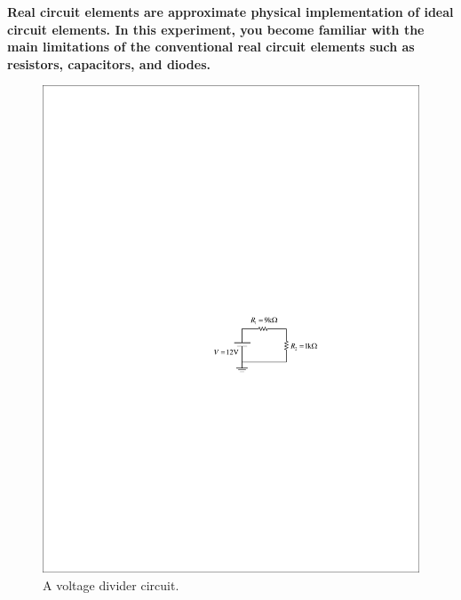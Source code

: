 \documentclass[11pt]{article}
\begin{document}
\textbf{Real circuit elements are approximate physical implementation of ideal circuit elements. In this experiment, you become familiar with the main limitations of the conventional real circuit elements such as resistors, capacitors, and diodes.
}



\begin{question}


    \begin{figure}[H]
        \centering
        \includegraphics[scale=1.2,angle=0]{Fig/cir1.pdf}
        \caption{A voltage divider circuit.} \label{fig:cir1}
    \end{figure}


\end{question}
\end{document}

